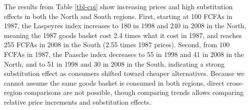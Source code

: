 \documentclass[
  letterpaper,
  DIV=11,
  numbers=noendperiod]{scrartcl}
\begin{document}
The results from Table \ref{tbl-cpi} show increasing prices and high
substitution effects in both the North and South regions. First,
starting at 100 FCFAs in 1987, the Laspeyres index increases to 180 in
1998 and 240 in 2008 in the North, meaning the 1987 goods basket cost
2.4 times what it cost in 1987, and reaches 255 FCFAs in 2008 in the
South (2.55 times 1987 prices). Second, from 100 FCFAs in 1987, the
Paasche index decreases to 55 in 1998 and 41 in 2008 in the North, and
to 51 in 1998 and 30 in 2008 in the South, indicating a strong
substitution effect as consumers shifted toward cheaper alternatives.
Because we cannot assume the same goods basket is consumed in both
regions, direct cross-region comparisons are not possible, though
comparing trends allows comparing relative price increments and
substitution effects.
\end{document}
